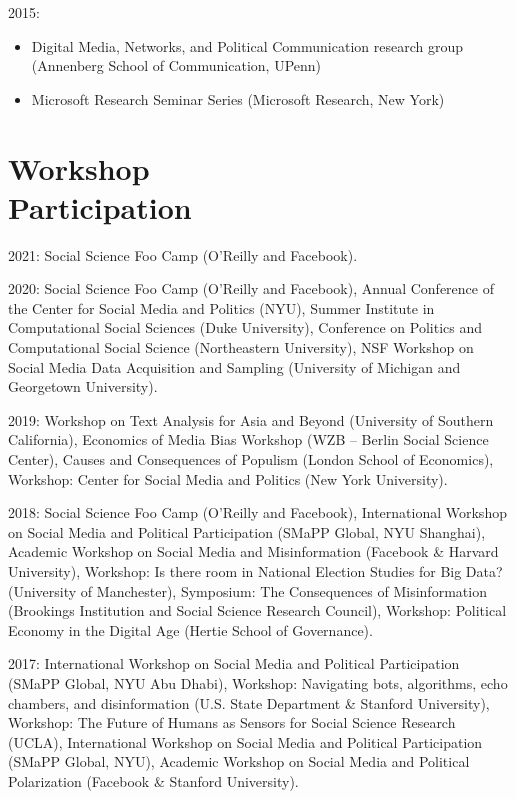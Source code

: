 \documentclass[margin,line,11pt]{resume}
\begin{document}
\begin{resume}
\newpage

2015:
\begin{itemize}
\item Digital Media, Networks, and Political Communication research group (Annenberg School of Communication, UPenn)
\item Microsoft Research Seminar Series (Microsoft Research, New York)
\end{itemize}

 
  
        \section{\mysidestyle Workshop\\Participation}
2021: Social Science Foo Camp (O'Reilly and Facebook).

2020: Social Science Foo Camp (O'Reilly and Facebook), Annual Conference of the Center for Social Media and Politics (NYU), Summer Institute in Computational Social Sciences (Duke University), Conference on Politics and Computational Social Science (Northeastern University), NSF Workshop on Social Media Data Acquisition and Sampling (University of Michigan and Georgetown University).
        
2019: Workshop on Text Analysis for Asia and Beyond (University of Southern California), Economics of Media Bias Workshop (WZB -- Berlin Social Science Center), Causes and Consequences of Populism (London School of Economics), Workshop: Center for Social Media and Politics (New York University).
    
      
2018: Social Science Foo Camp (O'Reilly and Facebook), International Workshop on Social Media and Political Participation (SMaPP Global, NYU Shanghai), Academic Workshop on Social Media and Misinformation (Facebook \& Harvard University), Workshop: Is there room in National Election Studies for Big Data? (University of Manchester), Symposium: The Consequences of Misinformation (Brookings Institution and Social Science Research Council), Workshop: Political Economy in the Digital Age (Hertie School of Governance).



2017: International Workshop on Social Media and Political Participation (SMaPP Global, NYU Abu Dhabi), Workshop: Navigating bots, algorithms, echo chambers, and disinformation (U.S. State Department \& Stanford University), Workshop: The Future of Humans as Sensors for Social Science Research (UCLA),  International Workshop on Social Media and Political Participation (SMaPP Global, NYU), Academic Workshop on Social Media and Political Polarization (Facebook \& Stanford University).


\end{resume}
\end{document}
